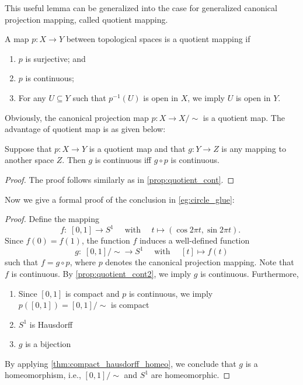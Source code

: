 This useful lemma can be generalized into the case for generalized canonical projection mapping, called quotient mapping.

\begin{definition} \label{def:quotient_map}  A map \(p: X \rightarrow  Y\) between topological spaces is a quotient mapping if
\begin{enumerate}
    \item \(p\) is surjective; and
\item \(p\) is continuous;
\item For any \(U \subseteq  Y\) such that \({p}^{-1}\left( U\right)\) is open in \(X\), we imply \(U\) is open in \(Y\).
\end{enumerate}
\end{definition}

Obviously, the canonical projection map $p: X \to X/\sim$ is a quotient map. The advantage of quotient map is as given below:
\begin{proposition} \label{prop:quotient_cont2} Suppose that \(p: X \rightarrow  Y\) is a quotient map and that \(g: Y \rightarrow  Z\) is any mapping to another space \(Z\). Then \(g\) is continuous iff \(g \circ  p\) is continuous.
\end{proposition}
\begin{proof}
The proof follows similarly as in \autoref{prop:quotient_cont}.
\end{proof} 

Now we give a formal proof of the conclusion in \autoref{eg:circle_glue}:
\begin{proof} Define the mapping
\[
f: \;\left\lbrack  {0,1}\right\rbrack   \rightarrow  {S}^{1}
\quad 
\text{ with } \quad t \mapsto  \left( {\cos {2\pi t},\sin {2\pi t}}\right) \text{. }
\]
Since \(f\left( 0\right)  = f\left( 1\right)\), the function \(f\) induces a well-defined function
\[
g: \;\left\lbrack  {0,1}\right\rbrack  / \sim   \rightarrow  {S}^{1}
\quad
\text{ with }\quad \left\lbrack  t\right\rbrack   \mapsto  f\left( t\right)
\]
such that \(f = g \circ  p\), where \(p\) denotes the canonical projection mapping. Note that \(f\) is continuous. By \autoref{prop:quotient_cont2}, we imply \(g\) is continuous. Furthermore,
\begin{enumerate}
    \item Since \(\left\lbrack  {0,1}\right\rbrack\) is compact and \(p\) is continuous, we imply \(p\left( \left\lbrack  {0,1}\right\rbrack  \right)  = \left\lbrack  {0,1}\right\rbrack  / \sim\) is compact
\item \({S}^{1}\) is Hausdorff
\item \(g\) is a bijection
\end{enumerate}
By applying \autoref{thm:compact_hausdorff_homeo}, we conclude that \(g\) is a homeomorphism, i.e., \(\left\lbrack  {0,1}\right\rbrack  / \sim\) and \({S}^{1}\) are homeomorphic.
\end{proof}

